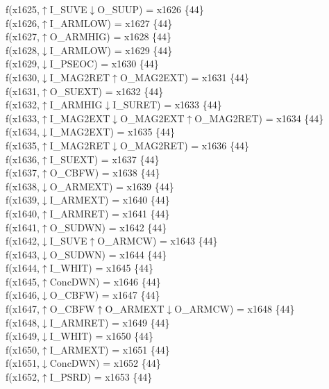 f(x1625,$\uparrow$I\_SUVE$\downarrow$O\_SUUP) = x1626 \{44\} \\  
f(x1626,$\uparrow$I\_ARMLOW) = x1627 \{44\} \\  
f(x1627,$\uparrow$O\_ARMHIG) = x1628 \{44\} \\  
f(x1628,$\downarrow$I\_ARMLOW) = x1629 \{44\} \\  
f(x1629,$\downarrow$I\_PSEOC) = x1630 \{44\} \\  
f(x1630,$\downarrow$I\_MAG2RET$\uparrow$O\_MAG2EXT) = x1631 \{44\} \\  
f(x1631,$\uparrow$O\_SUEXT) = x1632 \{44\} \\  
f(x1632,$\uparrow$I\_ARMHIG$\downarrow$I\_SURET) = x1633 \{44\} \\  
f(x1633,$\uparrow$I\_MAG2EXT$\downarrow$O\_MAG2EXT$\uparrow$O\_MAG2RET) = x1634 \{44\} \\  
f(x1634,$\downarrow$I\_MAG2EXT) = x1635 \{44\} \\  
f(x1635,$\uparrow$I\_MAG2RET$\downarrow$O\_MAG2RET) = x1636 \{44\} \\  
f(x1636,$\uparrow$I\_SUEXT) = x1637 \{44\} \\  
f(x1637,$\uparrow$O\_CBFW) = x1638 \{44\} \\  
f(x1638,$\downarrow$O\_ARMEXT) = x1639 \{44\} \\  
f(x1639,$\downarrow$I\_ARMEXT) = x1640 \{44\} \\  
f(x1640,$\uparrow$I\_ARMRET) = x1641 \{44\} \\  
f(x1641,$\uparrow$O\_SUDWN) = x1642 \{44\} \\  
f(x1642,$\downarrow$I\_SUVE$\uparrow$O\_ARMCW) = x1643 \{44\} \\  
f(x1643,$\downarrow$O\_SUDWN) = x1644 \{44\} \\  
f(x1644,$\uparrow$I\_WHIT) = x1645 \{44\} \\  
f(x1645,$\uparrow$ConcDWN) = x1646 \{44\} \\  
f(x1646,$\downarrow$O\_CBFW) = x1647 \{44\} \\  
f(x1647,$\uparrow$O\_CBFW$\uparrow$O\_ARMEXT$\downarrow$O\_ARMCW) = x1648 \{44\} \\  
f(x1648,$\downarrow$I\_ARMRET) = x1649 \{44\} \\  
f(x1649,$\downarrow$I\_WHIT) = x1650 \{44\} \\  
f(x1650,$\uparrow$I\_ARMEXT) = x1651 \{44\} \\  
f(x1651,$\downarrow$ConcDWN) = x1652 \{44\} \\  
f(x1652,$\uparrow$I\_PSRD) = x1653 \{44\} \\  
